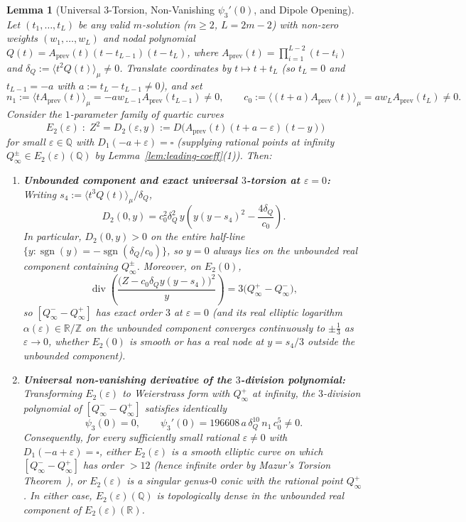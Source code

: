 \documentclass[11pt,a4paper]{article}
\newtheorem{lemma}[theorem]{Lemma}
\theoremstyle{definition}
\theoremstyle{remark}
\newcommand{\QQ}{\mathbb{Q}}
\newcommand{\RR}{\mathbb{R}}
\newcommand{\ZZ}{\mathbb{Z}}
\begin{document}
\begin{lemma}[Universal $3$-Torsion, Non-Vanishing $\psi_3'(0)$, and Dipole Opening]
\label{lem:universal-dipole}
Let $(t_1, \dots, t_L)$ be any valid $m$-solution ($m \ge 2$, $L = 2m - 2$) with non-zero weights $(w_1, \dots, w_L)$ and nodal polynomial $Q(t) = A_{\mathrm{prev}}(t)(t - t_{L-1})(t - t_L)$, where $A_{\mathrm{prev}}(t) = \prod_{i=1}^{L-2} (t - t_i)$ and $\delta_Q := \langle t^2 Q(t) \rangle_\mu \neq 0$. Translate coordinates by $t \mapsto t + t_L$ (so $t_L = 0$ and $t_{L-1} = -a$ with $a := t_L - t_{L-1} \neq 0$), and set
\[
n_1 := \langle t A_{\mathrm{prev}}(t) \rangle_\mu = -a w_{L-1} A_{\mathrm{prev}}(t_{L-1}) \neq 0, \qquad
c_0 := \langle (t + a) A_{\mathrm{prev}}(t) \rangle_\mu = a w_L A_{\mathrm{prev}}(t_L) \neq 0.
\]
Consider the $1$-parameter family of quartic curves
\[
E_2(\varepsilon) \;:\; Z^2 = D_2(\varepsilon, y) := D\!\Big(A_{\mathrm{prev}}(t)(t + a - \varepsilon)(t - y)\Big)
\]
for small $\varepsilon \in \QQ$ with $D_1(-a + \varepsilon) = \square$ (supplying rational points at infinity $Q_\infty^\pm \in E_2(\varepsilon)(\QQ)$ by Lemma~\ref{lem:leading-coeff}(1)). Then:
\begin{enumerate}
\item[(1)] \textbf{Unbounded component and exact universal $3$-torsion at $\varepsilon = 0$:} Writing $s_4 := \langle t^3 Q(t) \rangle_\mu / \delta_Q$,
\[
D_2(0, y) = c_0^2 \delta_Q^2 \, y \left(y (y - s_4)^2 - \frac{4 \delta_Q}{c_0}\right).
\]
In particular, $D_2(0, y) > 0$ on the entire half-line $\{y : \operatorname{sgn}(y) = -\operatorname{sgn}(\delta_Q / c_0)\}$, so $y = 0$ always lies on the unbounded real component containing $Q_\infty^\pm$. Moreover, on $E_2(0)$,
\[
\operatorname{div}\!\left(\frac{\big(Z - c_0 \delta_Q y(y - s_4)\big)^2}{y}\right) = 3\big(Q_\infty^+ - Q_\infty^-\big),
\]
so $[Q_\infty^- - Q_\infty^+]$ has exact order $3$ at $\varepsilon = 0$ (and its real elliptic logarithm $\alpha(\varepsilon) \in \RR/\ZZ$ on the unbounded component converges continuously to $\pm \frac{1}{3}$ as $\varepsilon \to 0$, whether $E_2(0)$ is smooth or has a real node at $y = s_4 / 3$ outside the unbounded component).
\item[(2)] \textbf{Universal non-vanishing derivative of the $3$-division polynomial:} Transforming $E_2(\varepsilon)$ to Weierstrass form with $Q_\infty^+$ at infinity, the $3$-division polynomial of $[Q_\infty^- - Q_\infty^+]$ satisfies identically
\[
\psi_3(0) = 0, \qquad \psi_3'(0) = 196608 \, a \, \delta_Q^{10} \, n_1 \, c_0^5 \neq 0.
\]
Consequently, for every sufficiently small rational $\varepsilon \neq 0$ with $D_1(-a + \varepsilon) = \square$, either $E_2(\varepsilon)$ is a smooth elliptic curve on which $[Q_\infty^- - Q_\infty^+]$ has order $> 12$ (hence \emph{infinite order} by Mazur's Torsion Theorem~\cite{Mazur1977}), or $E_2(\varepsilon)$ is a singular genus-$0$ conic with the rational point $Q_\infty^+$. In either case, $E_2(\varepsilon)(\QQ)$ is topologically dense in the unbounded real component of $E_2(\varepsilon)(\RR)$.

\end{enumerate}
\end{lemma}
\end{document}
